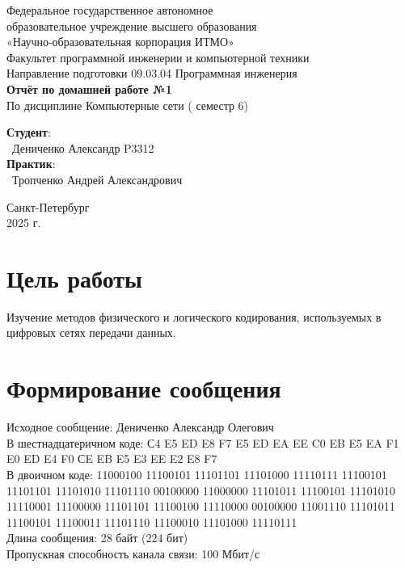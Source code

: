 \documentclass{article}
\begin{document}
\begin{center}
    \Large
    Федеральное государственное автономное \\
    образовательное учреждение высшего образования \\ 
    «Научно-образовательная корпорация ИТМО»\\
    \vspace{0.5cm}
    \large
    Факультет программной инженерии и компьютерной техники \\
    Направление подготовки 09.03.04 Программная инженерия \\
    \vspace{1cm}
    \Large
    \textbf{Отчёт по домашней работе №1} \\
        По дисциплине Компьютерные сети ( семестр 6)\\
    \large
    \vspace{8cm}

    \begin{minipage}{.33\textwidth}
    \end{minipage}
    \hfill
    \begin{minipage}{.4\textwidth}
    
        \textbf{Студент}: \vspace{.1cm} \\
        \ Дениченко Александр P3312\\
        \textbf{Практик}:  \\
        \ Тропченко Андрей Александрович
    \end{minipage}
    \vfill
Санкт-Петербург\\ 2025 г.
\end{center}
\pagestyle{empty}
\newpage
\pagestyle{plain}

\section*{Цель работы}
Изучение методов физического и логического кодирования,
используемых в цифровых сетях передачи данных.

\section{Формирование сообщения}

Исходное сообщение: Дениченко Александр Олегович
\\
В шестнадцатеричном коде: С4 E5 ED E8 F7 E5 ED EA EE C0 EB E5 EA F1 E0 ED E4 F0 СE EB E5 E3 EE E2 E8 F7
\\
В двоичном коде: 11000100 11100101 11101101 11101000 11110111 11100101 11101101 11101010 11101110 00100000 11000000 11101011 11100101 11101010 11110001 11100000 11101101 11100100 11110000 00100000 11001110 11101011 11100101 11100011 11101110 11100010 11101000 11110111
\\
Длина сообщения: 28 байт (224 бит)
\\
Пропускная способность канала связи: 100 Мбит/с 
\end{document}
